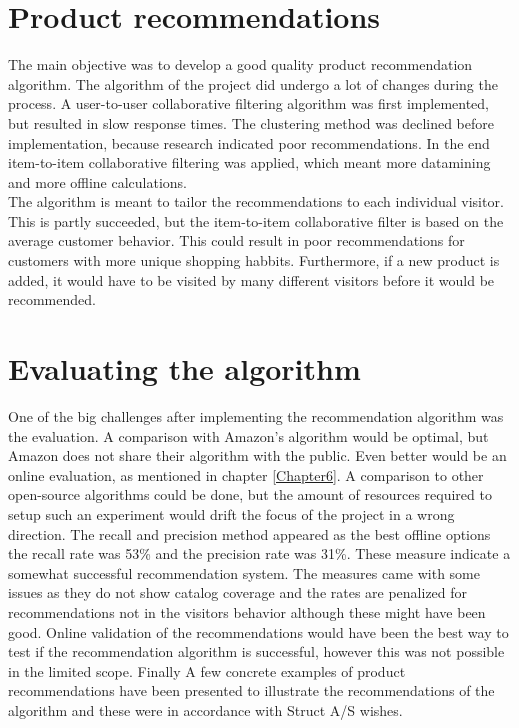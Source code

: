 \section{Product recommendations}
The main objective was to develop a good quality product recommendation algorithm. The algorithm of the project did undergo a lot of changes during the process. A user-to-user collaborative filtering algorithm was first implemented, but resulted in slow response times. The clustering method was declined before implementation, because research indicated poor recommendations. \cite{AmazonRecommendations} In the end item-to-item collaborative filtering was applied, which meant more datamining and more offline calculations. \\
The algorithm is meant to tailor the recommendations to each individual visitor. This is partly succeeded, but the item-to-item collaborative filter is based on the average customer behavior. This could result in poor recommendations for customers with more unique shopping habbits. Furthermore, if a new product is added, it would have to be visited by many different visitors before it would be recommended.

\section{Evaluating the algorithm}
One of the big challenges after implementing the recommendation algorithm was the evaluation. A comparison with Amazon's algorithm would be optimal, but Amazon does not share their algorithm with the public. Even better would be an online evaluation, as mentioned in chapter \ref{Chapter6}. A comparison to other open-source algorithms could be done, but the amount of resources required to setup such an experiment would drift the focus of the project in a wrong direction. The recall and precision method appeared as the best offline options the recall rate was 53\% and the precision rate was 31\%. These measure indicate a somewhat successful recommendation system. The measures came with some issues as they do not show catalog coverage and the rates are penalized for recommendations not in the visitors behavior although these might have been good. Online validation of the recommendations would have been the best way to test if the recommendation algorithm is successful, however this was not possible in the limited scope. Finally A few concrete examples of product recommendations have been presented to illustrate the recommendations of the algorithm and these were in accordance with Struct A/S wishes. 